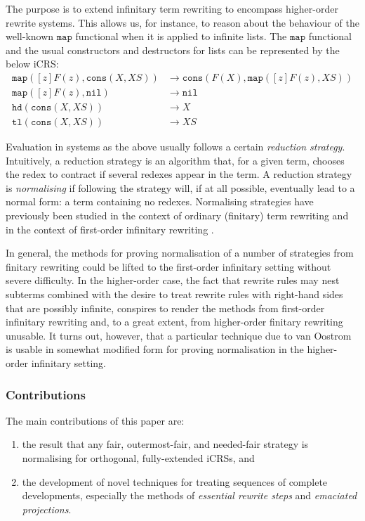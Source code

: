 \documentclass{LMCS}
\theoremstyle{definition}
\newcommand{\rew}{\rightarrow}
\begin{document}
The purpose is to extend infinitary term rewriting to encompass higher-order rewrite systems.
This allows us, for instance, to reason about the behaviour of the well-known $\mathtt{map}$ functional 
when it is applied to infinite lists. The $\mathtt{map}$ functional
and the usual constructors and destructors for lists can be represented by the below iCRS:
\begin{align*}
\mathtt{map}([z]F(z),\mathtt{cons}(X,XS)) & \rew
\mathtt{cons}(F(X),\mathtt{map}([z]F(z),XS)) \\
\mathtt{map}([z]F(z),\mathtt{nil}) & \rew \mathtt{nil}\\
\mathtt{hd}(\mathtt{cons}(X,XS)) & \rew X \\
\mathtt{tl}(\mathtt{cons}(X,XS)) & \rew XS
\end{align*}

Evaluation in systems as the above usually follows a certain \emph{reduction strategy}. Intuitively, a reduction strategy is an algorithm that, for a given term, chooses the redex to contract if several redexes appear in the term. A reduction strategy is \emph{normalising} if following the strategy will, if at all possible, eventually lead to a normal form: a term containing no redexes.
Normalising strategies have previously been studied in the context of 
ordinary (finitary) term rewriting \cite{HL91,T03_OV}
and in the context of first-order infinitary rewriting \cite{KKSV95}. 

In general, the methods for proving normalisation of a number of strategies from finitary rewriting could be lifted to the first-order infinitary setting without severe difficulty. In the higher-order case, the fact that rewrite rules may nest subterms combined with the desire to treat rewrite rules with right-hand sides that are possibly infinite, conspires to render the methods from first-order infinitary rewriting and, to a great extent, from higher-order finitary rewriting unusable. It turns out, however, that a particular
technique due to van Oostrom \cite{O99} is usable in somewhat modified form
for proving normalisation in the higher-order infinitary setting.

\subsubsection*{Contributions}

The main contributions of this paper are:

\begin{enumerate}[$\bullet$]

\item the result that any fair, outermost-fair, and needed-fair strategy is normalising for orthogonal, fully-extended iCRSs, and

\item the development of novel techniques for treating sequences of complete developments, especially the methods of \emph{essential rewrite steps} and \emph{emaciated projections}.

\end{enumerate}
\end{document}
